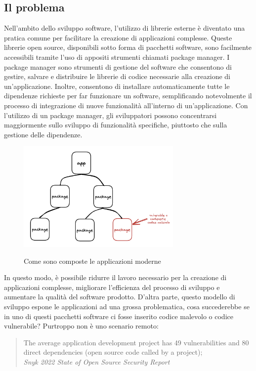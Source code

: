 \subsection{Il problema}
\label{sec:security-problem}
Nell'ambito dello sviluppo software, l'utilizzo di librerie esterne è diventato una pratica comune per facilitare la
creazione di applicazioni complesse. Queste librerie open source, disponibili sotto forma di pacchetti software, sono
facilmente accessibili tramite l'uso di appositi strumenti chiamati package manager. I package manager sono strumenti di
gestione del software che consentono di gestire, salvare e distribuire le librerie di codice necessarie alla creazione
di un'applicazione. Inoltre, consentono di installare automaticamente tutte le dipendenze richieste per far funzionare
un software, semplificando notevolmente il processo di integrazione di nuove funzionalità all'interno di
un'applicazione. Con l'utilizzo di un package manager, gli sviluppatori possono concentrarsi maggiormente sullo sviluppo
di funzionalità specifiche, piuttosto che sulla gestione delle dipendenze.
\begin{figure}[h]
    \centering
    \captionsetup{justification=centering}
    \includegraphics[width=8cm]{./chapters/2.wasi-in-depth/images/1.malicious_or_vuln_code.png}
    \label{app_package}
    \caption{Come sono composte le applicazioni moderne}
\end{figure}
In questo modo, è possibile ridurre il lavoro necessario per la creazione di applicazioni complesse, migliorare
l'efficienza del processo di sviluppo e aumentare la qualità del software prodotto. D'altra parte, questo modello di
sviluppo espone le applicazioni ad una grossa problematica, cosa succederebbe se in uno di questi pacchetti software ci
fosse inserito codice malevolo o codice vulnerabile? Purtroppo non è uno scenario remoto:
\begin{quote}
    The average application development project has 49 vulnerabilities and 80 direct dependencies (open source code
    called by a project); \\
    \textit{Snyk 2022 State of Open Source Security Report}\cite{snyk-2022-open-source-security}
\end{quote}
